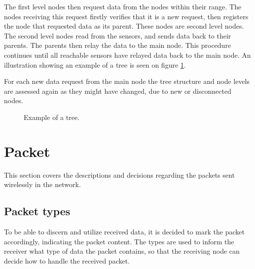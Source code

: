 The first level nodes then request data from the nodes within their range. 
The nodes receiving this request firstly verifies that it is a new request, then registers the node that requested data as its parent. 
These nodes are second level nodes. The second level nodes read from the sensors, and sends data back to their parents. The parents then relay the data to the main node. 
This procedure continues until all reachable sensors have relayed data back to the main node.
An illustration showing an example of a tree is seen on figure \ref{fig:prottree1}.

For each new data request from the main node the tree structure and node levels are assessed again as they might have changed, due to new or disconnected nodes.

\begin{figure}[!h]
	\centering
	\caption{Example of a tree.}
	\label{fig:prottree1}
\end{figure}


\section{Packet}
This section covers the descriptions and decisions regarding the packets sent wirelessly in the network.

\subsection{Packet types}
To be able to discern and utilize received data, it is decided to mark the packet accordingly, indicating the packet content.
The types are used to inform the receiver what type of data the packet contains, so that the receiving node can decide how to handle the received packet. 

